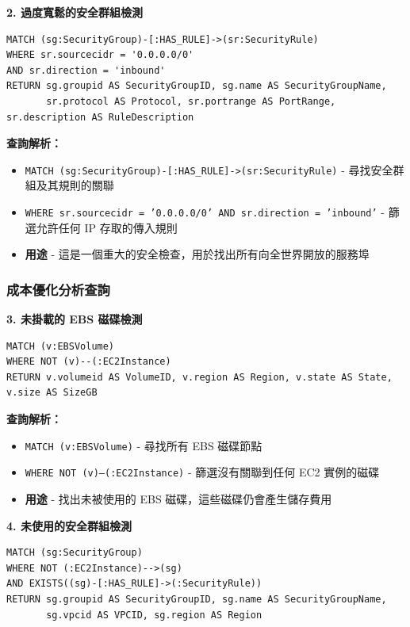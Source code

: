 \documentclass[11pt,a4paper]{ctexart}
\begin{document}
\textbf{2. 過度寬鬆的安全群組檢測}

\begin{lstlisting}[language=Cypher,caption={找出過度寬鬆的安全性群組}]
MATCH (sg:SecurityGroup)-[:HAS_RULE]->(sr:SecurityRule) 
WHERE sr.sourcecidr = '0.0.0.0/0'
AND sr.direction = 'inbound'
RETURN sg.groupid AS SecurityGroupID, sg.name AS SecurityGroupName, 
       sr.protocol AS Protocol, sr.portrange AS PortRange, sr.description AS RuleDescription
\end{lstlisting}

\textbf{查詢解析：}
\begin{itemize}[leftmargin=1.5em]
\item \texttt{MATCH (sg:SecurityGroup)-[:HAS\_RULE]->(sr:SecurityRule)} - 尋找安全群組及其規則的關聯
\item \texttt{WHERE sr.sourcecidr = '0.0.0.0/0' AND sr.direction = 'inbound'} - 篩選允許任何 IP 存取的傳入規則
\item \textbf{用途} - 這是一個重大的安全檢查，用於找出所有向全世界開放的服務埠
\end{itemize}

\subsubsection{成本優化分析查詢}

\textbf{3. 未掛載的 EBS 磁碟檢測}

\begin{lstlisting}[language=Cypher,caption={找出未掛載的 EBS 磁碟}]
MATCH (v:EBSVolume) 
WHERE NOT (v)--(:EC2Instance) 
RETURN v.volumeid AS VolumeID, v.region AS Region, v.state AS State, v.size AS SizeGB
\end{lstlisting}

\textbf{查詢解析：}
\begin{itemize}[leftmargin=1.5em]
\item \texttt{MATCH (v:EBSVolume)} - 尋找所有 EBS 磁碟節點
\item \texttt{WHERE NOT (v)--(:EC2Instance)} - 篩選沒有關聯到任何 EC2 實例的磁碟
\item \textbf{用途} - 找出未被使用的 EBS 磁碟，這些磁碟仍會產生儲存費用
\end{itemize}

\textbf{4. 未使用的安全群組檢測}

\begin{lstlisting}[language=Cypher,caption={找出未使用的安全性群組}]
MATCH (sg:SecurityGroup) 
WHERE NOT (:EC2Instance)-->(sg) 
AND EXISTS((sg)-[:HAS_RULE]->(:SecurityRule)) 
RETURN sg.groupid AS SecurityGroupID, sg.name AS SecurityGroupName, 
       sg.vpcid AS VPCID, sg.region AS Region
\end{lstlisting}
\end{document}
